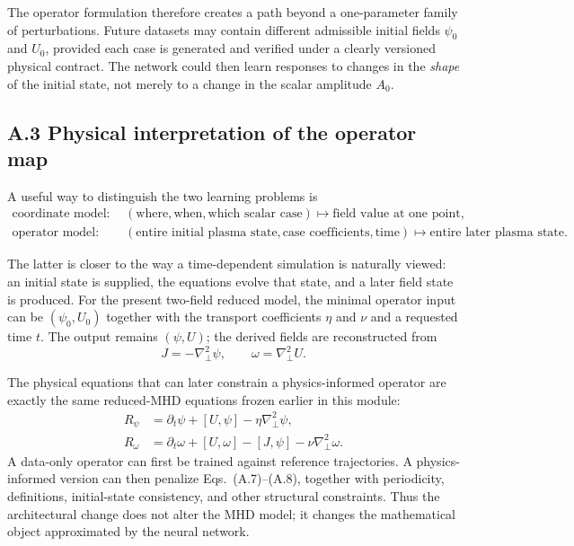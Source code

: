 \documentclass[11pt]{article}
\begin{document}
The operator formulation therefore creates a path beyond a one-parameter
family of perturbations.  Future datasets may contain different admissible
initial fields $\psi_0$ and $U_0$, provided each case is generated and verified
under a clearly versioned physical contract.  The network could then learn
responses to changes in the \emph{shape} of the initial state, not merely to a
change in the scalar amplitude $A_0$.

\clearpage
\subsection*{A.3 Physical interpretation of the operator map}

A useful way to distinguish the two learning problems is
\begin{align}
\text{coordinate model:}\qquad
 &(\text{where},\text{when},\text{which scalar case})
 \longmapsto \text{field value at one point},
 \tag{A.4}\\[0.5em]
\text{operator model:}\qquad
 &(\text{entire initial plasma state},\text{case coefficients},\text{time})
 \longmapsto \text{entire later plasma state}.
 \tag{A.5}
\end{align}

The latter is closer to the way a time-dependent simulation is naturally
viewed: an initial state is supplied, the equations evolve that state, and a
later field state is produced.  For the present two-field reduced model, the
minimal operator input can be $(\psi_0,U_0)$ together with the transport
coefficients $\eta$ and $\nu$ and a requested time $t$.  The output remains
$(\psi,U)$; the derived fields are reconstructed from
\begin{equation}
 J=-\nabla_\perp^2\psi,
 \qquad
 \omega=\nabla_\perp^2U.
 \tag{A.6}
\end{equation}

The physical equations that can later constrain a physics-informed operator
are exactly the same reduced-MHD equations frozen earlier in this module:
\begin{align}
 R_\psi
 &=\partial_t\psi+[U,\psi]-\eta\nabla_\perp^2\psi,
 \tag{A.7}\\
 R_\omega
 &=\partial_t\omega+[U,\omega]-[J,\psi]
   -\nu\nabla_\perp^2\omega.
 \tag{A.8}
\end{align}
A data-only operator can first be trained against reference trajectories.  A
physics-informed version can then penalize Eqs.~(A.7)--(A.8), together with
periodicity, definitions, initial-state consistency, and other structural
constraints.  Thus the architectural change does not alter the MHD model; it
changes the mathematical object approximated by the neural network.
\end{document}
